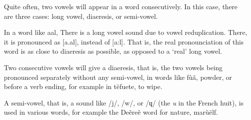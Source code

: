 Quite often, two vowels will appear in a word consecutively. In this case, there are three cases:
long vowel, diaeresis, or semi-vowel.

In a word like \gls{aal}, There is a long vowel sound due to vowel reduplication.
There, it is pronounced as [a.al], instead of [a:l]. That is, the real pronounciation of this word
is as close to diaeresis as possible, as opposed to a ‘real’ long vowel.

Two consecutive vowels will give a diaeresis, that is, the two vowels being pronounced separately
without any semi-vowel, in words like \gls{fùã}, powder, or before a verb ending, for example in
\gls{tëfuete}, to wipe.

A semi-vowel, that is, a sound like /j/, /w/, or /ɥ/ (the \emph{u} in the French huit), is used in
various words, for example the Deẽreẽ word for nature, \gls{marùëlf}.

